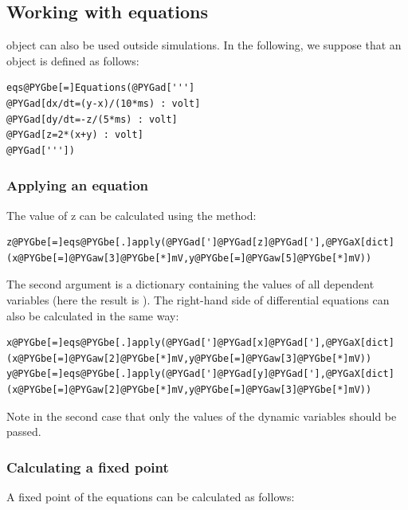 \documentclass[letterpaper,10pt]{manual}
\begin{document}
\subsection{Working with equations}

\hyperlink{brian.Equations}{} object can also be used outside simulations.
In the following, we suppose that an \hyperlink{brian.Equations}{} object is defined as follows:

\begin{Verbatim}[commandchars=@\[\]]
eqs@PYGbe[=]Equations(@PYGad[''']
@PYGad[dx/dt=(y-x)/(10*ms) : volt]
@PYGad[dy/dt=-z/(5*ms) : volt]
@PYGad[z=2*(x+y) : volt]
@PYGad['''])
\end{Verbatim}

\hypertarget{index-17}{}\subsubsection{Applying an equation}

The value of z can be calculated using the  method:

\begin{Verbatim}[commandchars=@\[\]]
z@PYGbe[=]eqs@PYGbe[.]apply(@PYGad[']@PYGad[z]@PYGad['],@PYGaX[dict](x@PYGbe[=]@PYGaw[3]@PYGbe[*]mV,y@PYGbe[=]@PYGaw[5]@PYGbe[*]mV))
\end{Verbatim}

The second argument is a dictionary containing the values of all dependent variables
(here the result is ).
The right-hand side of differential equations can also be calculated in the same way:

\begin{Verbatim}[commandchars=@\[\]]
x@PYGbe[=]eqs@PYGbe[.]apply(@PYGad[']@PYGad[x]@PYGad['],@PYGaX[dict](x@PYGbe[=]@PYGaw[2]@PYGbe[*]mV,y@PYGbe[=]@PYGaw[3]@PYGbe[*]mV))
y@PYGbe[=]eqs@PYGbe[.]apply(@PYGad[']@PYGad[y]@PYGad['],@PYGaX[dict](x@PYGbe[=]@PYGaw[2]@PYGbe[*]mV,y@PYGbe[=]@PYGaw[3]@PYGbe[*]mV))
\end{Verbatim}

Note in the second case that only the values of the dynamic variables should be passed.

\subsubsection{Calculating a fixed point}

A fixed point of the equations can be calculated as follows:
\end{document}
